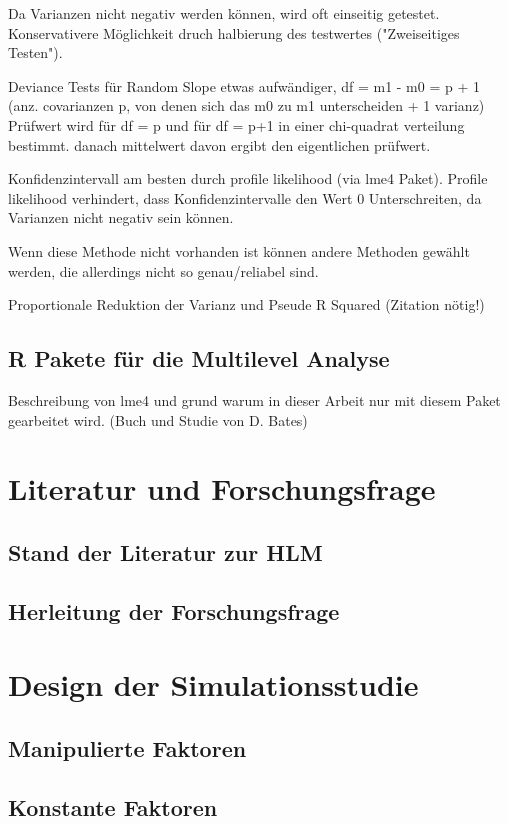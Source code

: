 \documentclass[12pt]{article}\usepackage[]{graphicx}\usepackage[]{color}
\begin{document}
Da Varianzen nicht negativ werden können, wird oft einseitig getestet. Konservativere Möglichkeit druch halbierung des testwertes ("Zweiseitiges Testen").


Deviance Tests für Random Slope etwas aufwändiger, df = m1 - m0 = p + 1 (anz. covarianzen p, von denen sich das m0 zu m1 unterscheiden + 1 varianz) Prüfwert wird für df = p und für df = p+1 in einer chi-quadrat verteilung bestimmt. danach mittelwert davon ergibt den eigentlichen prüfwert. 

Konfidenzintervall am besten durch profile likelihood (via lme4 Paket). Profile likelihood verhindert, dass Konfidenzintervalle den Wert 0 Unterschreiten, da Varianzen nicht negativ sein können. 

Wenn diese Methode nicht vorhanden ist können andere Methoden gewählt werden, die allerdings nicht so genau/reliabel sind.

Proportionale Reduktion der Varianz und Pseude R Squared (Zitation nötig!)

\subsection{R Pakete für die Multilevel Analyse}
Beschreibung von lme4 und grund warum in dieser Arbeit nur mit diesem Paket gearbeitet wird. (Buch und Studie von D. Bates)

\section{Literatur und Forschungsfrage}
\subsection{Stand der Literatur zur HLM}
\subsection{Herleitung der Forschungsfrage}

\section{Design der Simulationsstudie}
\subsection{Manipulierte Faktoren}
\subsection{Konstante Faktoren}
\end{document}
